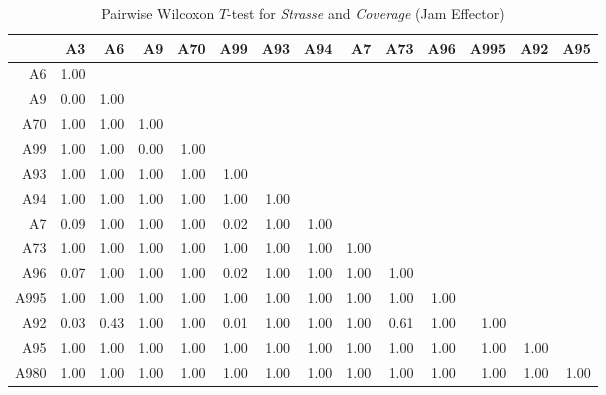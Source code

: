 \begin{table}[ht]
	\tiny
	\centering
	\begin{tabular}{rrrrrrrrrrrrrr}
		\toprule
			 & A3 & A6 & A9 & A70 & A99 & A93 & A94 & A7 & A73 & A96 & A995 & A92 & A95 \\ 
		\midrule
		A6   & 1.00 &  &  &  &  &  &  &  &  &  &  &  &  \\ 
		A9   & 0.00 & 1.00 &  &  &  &  &  &  &  &  &  &  &  \\ 
		A70  & 1.00 & 1.00 & 1.00 &  &  &  &  &  &  &  &  &  &  \\ 
		A99  & 1.00 & 1.00 & 0.00 & 1.00 &  &  &  &  &  &  &  &  &  \\ 
		A93  & 1.00 & 1.00 & 1.00 & 1.00 & 1.00 &  &  &  &  &  &  &  &  \\ 
		A94  & 1.00 & 1.00 & 1.00 & 1.00 & 1.00 & 1.00 &  &  &  &  &  &  &  \\ 
		A7   & 0.09 & 1.00 & 1.00 & 1.00 & 0.02 & 1.00 & 1.00 &  &  &  &  &  &  \\ 
		A73  & 1.00 & 1.00 & 1.00 & 1.00 & 1.00 & 1.00 & 1.00 & 1.00 &  &  &  &  &  \\ 
		A96  & 0.07 & 1.00 & 1.00 & 1.00 & 0.02 & 1.00 & 1.00 & 1.00 & 1.00 &  &  &  &  \\ 
		A995 & 1.00 & 1.00 & 1.00 & 1.00 & 1.00 & 1.00 & 1.00 & 1.00 & 1.00 & 1.00 &  &  &  \\ 
		A92  & 0.03 & 0.43 & 1.00 & 1.00 & 0.01 & 1.00 & 1.00 & 1.00 & 0.61 & 1.00 & 1.00 &  &  \\ 
		A95  & 1.00 & 1.00 & 1.00 & 1.00 & 1.00 & 1.00 & 1.00 & 1.00 & 1.00 & 1.00 & 1.00 & 1.00 &  \\ 
		A980 & 1.00 & 1.00 & 1.00 & 1.00 & 1.00 & 1.00 & 1.00 & 1.00 & 1.00 & 1.00 & 1.00 & 1.00 & 1.00 \\ 
		\bottomrule
	  \end{tabular}
    \caption{Pairwise Wilcoxon $T$-test for \textit{Strasse} and \textit{Coverage} (Jam Effector)}
    \label{tbl:wilcoxon_baysis_effector_Strasse_Cov}
\end{table}
